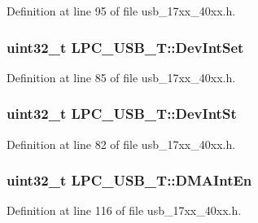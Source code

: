 Definition at line 95 of file usb\+\_\+17xx\+\_\+40xx.\+h.

\subsubsection[{\texorpdfstring{Dev\+Int\+Set}{DevIntSet}}]{ uint32\+\_\+t L\+P\+C\+\_\+\+U\+S\+B\+\_\+\+T\+::\+Dev\+Int\+Set}\hypertarget{structLPC__USB__T_a56fd09dcb8b332ea21c6ea08e3ee547b}{}\label{structLPC__USB__T_a56fd09dcb8b332ea21c6ea08e3ee547b}


Definition at line 85 of file usb\+\_\+17xx\+\_\+40xx.\+h.

\subsubsection[{\texorpdfstring{Dev\+Int\+St}{DevIntSt}}]{ uint32\+\_\+t L\+P\+C\+\_\+\+U\+S\+B\+\_\+\+T\+::\+Dev\+Int\+St}\hypertarget{structLPC__USB__T_a0dcd495852e02d653cf8ef586b0c9b06}{}\label{structLPC__USB__T_a0dcd495852e02d653cf8ef586b0c9b06}


Definition at line 82 of file usb\+\_\+17xx\+\_\+40xx.\+h.

\subsubsection[{\texorpdfstring{D\+M\+A\+Int\+En}{DMAIntEn}}]{ uint32\+\_\+t L\+P\+C\+\_\+\+U\+S\+B\+\_\+\+T\+::\+D\+M\+A\+Int\+En}\hypertarget{structLPC__USB__T_aa0c54071fe474acc1d5e940d1e37b899}{}\label{structLPC__USB__T_aa0c54071fe474acc1d5e940d1e37b899}


Definition at line 116 of file usb\+\_\+17xx\+\_\+40xx.\+h.

